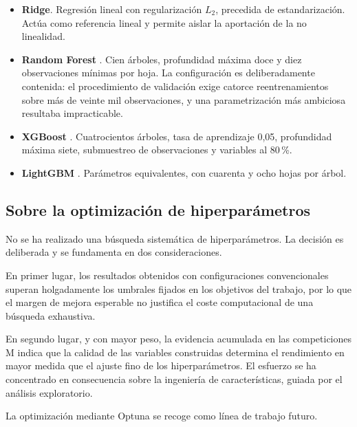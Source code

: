 \begin{itemize}
  \item \textbf{Ridge}. Regresión lineal con regularización $L_2$, precedida de
        estandarización. Actúa como referencia lineal y permite aislar la
        aportación de la no linealidad.

  \item \textbf{Random Forest} \parencite{breiman2001rf}. Cien árboles, profundidad
        máxima doce y diez observaciones mínimas por hoja. La configuración es
        deliberadamente contenida: el procedimiento de validación exige catorce
        reentrenamientos sobre más de veinte mil observaciones, y una
        parametrización más ambiciosa resultaba impracticable.

  \item \textbf{XGBoost} \parencite{chen2016xgboost}. Cuatrocientos árboles, tasa
        de aprendizaje 0,05, profundidad máxima siete, submuestreo de
        observaciones y variables al 80\,\%.

  \item \textbf{LightGBM} \parencite{ke2017lightgbm}. Parámetros equivalentes,
        con cuarenta y ocho hojas por árbol.
\end{itemize}

\subsection{Sobre la optimización de hiperparámetros}

No se ha realizado una búsqueda sistemática de hiperparámetros. La decisión es
deliberada y se fundamenta en dos consideraciones.

En primer lugar, los resultados obtenidos con configuraciones convencionales
superan holgadamente los umbrales fijados en los objetivos del trabajo, por lo que
el margen de mejora esperable no justifica el coste computacional de una búsqueda
exhaustiva.

En segundo lugar, y con mayor peso, la evidencia acumulada en las competiciones M
\parencite{makridakis2022m5} indica que la calidad de las variables construidas
determina el rendimiento en mayor medida que el ajuste fino de los
hiperparámetros. El esfuerzo se ha concentrado en consecuencia sobre la ingeniería
de características, guiada por el análisis exploratorio.

La optimización mediante Optuna se recoge como línea de trabajo futuro.



